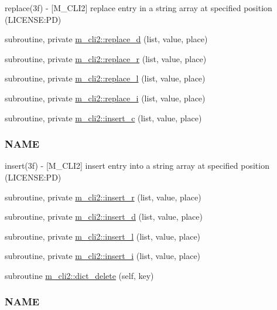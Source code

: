 \begin{DoxyCompactItemize}
\begin{DoxyCompactList}
replace(3f) -\/ \mbox{[}M\+\_\+\+C\+L\+I2\mbox{]} replace entry in a string array at specified position (L\+I\+C\+E\+N\+SE\+:PD) \end{DoxyCompactList}\item 
subroutine, private \mbox{\hyperlink{namespacem__cli2_ac327823dd714cd4c1667666158f0c135}{m\+\_\+cli2\+::replace\+\_\+d}} (list, value, place)
\item 
subroutine, private \mbox{\hyperlink{namespacem__cli2_abe681a8b55ae238b029766713a79210a}{m\+\_\+cli2\+::replace\+\_\+r}} (list, value, place)
\item 
subroutine, private \mbox{\hyperlink{namespacem__cli2_ae4a1802207f6b67e36cbf89003d6fb55}{m\+\_\+cli2\+::replace\+\_\+l}} (list, value, place)
\item 
subroutine, private \mbox{\hyperlink{namespacem__cli2_a0a591fd55e8010f26eb6f9f6bafc1ddb}{m\+\_\+cli2\+::replace\+\_\+i}} (list, value, place)
\item 
subroutine, private \mbox{\hyperlink{namespacem__cli2_ab3f2aa827b3b7ff419bcdc3ccb2672b3}{m\+\_\+cli2\+::insert\+\_\+c}} (list, value, place)
\begin{DoxyCompactList}\small\item\em \subsubsection*{N\+A\+ME}

insert(3f) -\/ \mbox{[}M\+\_\+\+C\+L\+I2\mbox{]} insert entry into a string array at specified position (L\+I\+C\+E\+N\+SE\+:PD) \end{DoxyCompactList}\item 
subroutine, private \mbox{\hyperlink{namespacem__cli2_ae43e655d3678fcc31824a3e9db3daae1}{m\+\_\+cli2\+::insert\+\_\+r}} (list, value, place)
\item 
subroutine, private \mbox{\hyperlink{namespacem__cli2_a737ae8e6f73a3fc8cc260732c047fafb}{m\+\_\+cli2\+::insert\+\_\+d}} (list, value, place)
\item 
subroutine, private \mbox{\hyperlink{namespacem__cli2_a7e5ee66813d8f6db9d48ebdc350a6b3e}{m\+\_\+cli2\+::insert\+\_\+l}} (list, value, place)
\item 
subroutine, private \mbox{\hyperlink{namespacem__cli2_afa6f00a57f1252ba5daa0c440a23ffbb}{m\+\_\+cli2\+::insert\+\_\+i}} (list, value, place)
\item 
subroutine \mbox{\hyperlink{namespacem__cli2_afcdd2c59305faf341ebf8ec3b115a05e}{m\+\_\+cli2\+::dict\+\_\+delete}} (self, key)
\begin{DoxyCompactList}\small\item\em \subsubsection*{N\+A\+ME}


\end{DoxyCompactList}
\end{DoxyCompactItemize}
